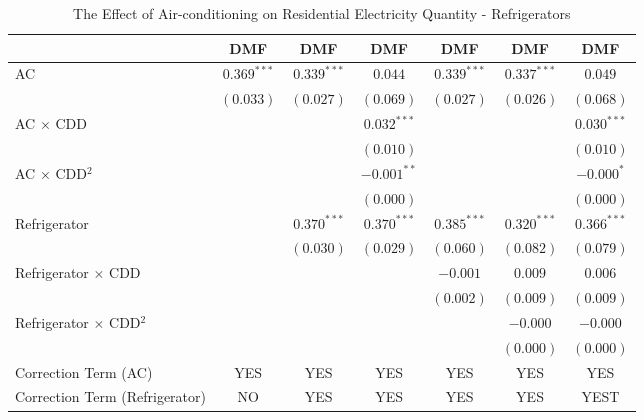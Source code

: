 
\begin{table}[htbp]
\caption{The Effect of Air-conditioning on Residential Electricity Quantity - Refrigerators}
\begin{center}
\begin{tabular}{l c c c c c c}
\hline
 & DMF & DMF & DMF & DMF & DMF & DMF \\
\hline
AC                             & $0.369^{***}$ & $0.339^{***}$ & $0.044$       & $0.339^{***}$ & $0.337^{***}$ & $0.049$       \\
                               & $(0.033)$     & $(0.027)$     & $(0.069)$     & $(0.027)$     & $(0.026)$     & $(0.068)$     \\
AC $\times$ CDD                &               &               & $0.032^{***}$ &               &               & $0.030^{***}$ \\
                               &               &               & $(0.010)$     &               &               & $(0.010)$     \\
AC $\times$ CDD$^2$            &               &               & $-0.001^{**}$ &               &               & $-0.000^{*}$  \\
                               &               &               & $(0.000)$     &               &               & $(0.000)$     \\
Refrigerator                   &               & $0.370^{***}$ & $0.370^{***}$ & $0.385^{***}$ & $0.320^{***}$ & $0.366^{***}$ \\
                               &               & $(0.030)$     & $(0.029)$     & $(0.060)$     & $(0.082)$     & $(0.079)$     \\
Refrigerator $\times$ CDD      &               &               &               & $-0.001$      & $0.009$       & $0.006$       \\
                               &               &               &               & $(0.002)$     & $(0.009)$     & $(0.009)$     \\
Refrigerator $\times$ CDD$^2$  &               &               &               &               & $-0.000$      & $-0.000$      \\
                               &               &               &               &               & $(0.000)$     & $(0.000)$     \\
\hline
Correction Term (AC)           & YES           & YES           & YES           & YES           & YES           & YES           \\
Correction Term (Refrigerator) & NO            & YES           & YES           & YES           & YES           & YEST          \\

\end{tabular}
\end{center}
\end{table}
